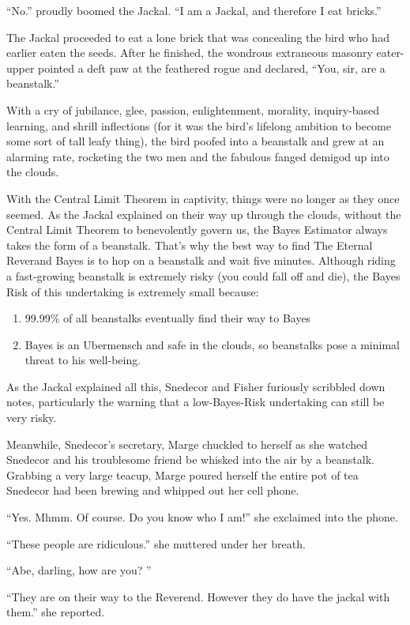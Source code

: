 \documentclass{article}
\begin{document}
``No.'' proudly boomed the Jackal. ``I am a Jackal, and therefore I eat bricks.'' 

The Jackal proceeded to eat a lone brick that was concealing the bird who had earlier eaten the seeds. After he finished, the wondrous extraneous masonry eater-upper pointed a deft paw at the feathered rogue and declared, ``You, sir, are a beanstalk.'' 

With a cry of jubilance, glee, passion, enlightenment, morality, inquiry-based learning, and shrill inflections (for it was the bird's lifelong ambition to become some sort of tall leafy thing), the bird poofed into a beanstalk and grew at an alarming rate, rocketing the two men and the fabulous fanged demigod up into the clouds. 

With the Central Limit Theorem in captivity, things were no longer as they once seemed. As the Jackal explained on their way up through the clouds, without the Central Limit Theorem to benevolently govern us, the Bayes Estimator always takes the form of a beanstalk. That's why the best way to find The Eternal Reverand Bayes is to hop on a beanstalk and wait five minutes. Although riding a fast-growing beanstalk is extremely risky (you could fall off and die), the Bayes Risk of this undertaking is extremely small because:

\begin{enumerate}
\item 99.99\% of all beanstalks eventually find their way to Bayes
\item Bayes is an Ubermensch and safe in the clouds, so beanstalks pose a minimal threat to his well-being.
\end{enumerate}
As the Jackal explained all this, Snedecor and Fisher furiously scribbled down notes, particularly the warning that a low-Bayes-Risk undertaking can still be very risky.

Meanwhile, Snedecor's secretary, Marge chuckled to herself as she watched Snedecor and his troublesome friend be whisked into the air by a beanstalk. Grabbing a very large teacup, Marge poured herself the entire pot of tea Snedecor had been brewing and whipped out her cell phone. 

``Yes. Mhmm. Of course. Do you know who I am!'' she exclaimed into the phone. 

``These people are ridiculous.'' she muttered under her breath. 

``Abe, darling, how are you? ''

``They are on their way to the Reverend. However they do have the jackal with them.'' she reported.
\end{document}
